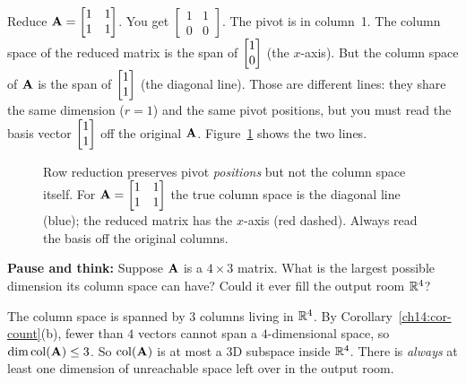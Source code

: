 \begin{labbox}
Reduce $\mathbf{A}=\begin{bmatrix}1&1\\1&1\end{bmatrix}$. You get
$\begin{bmatrix}1&1\\0&0\end{bmatrix}$. The pivot is in column~1. The column space of the reduced
matrix is the span of $\begin{bmatrix}1\\0\end{bmatrix}$ (the $x$-axis). But the column space of $\mathbf{A}$ is the
span of $\begin{bmatrix}1\\1\end{bmatrix}$ (the diagonal line). Those are different lines: they share the same dimension
($r=1$) and the same pivot positions, but you must read the basis vector $\begin{bmatrix}1\\1\end{bmatrix}$ off the
original $\mathbf{A}$. Figure~\ref{ch15:colspace-trap} shows the two lines.
\end{labbox}

\begin{figure}[htbp]
\centering
{}
\caption{Row reduction preserves pivot \emph{positions} but not the column space itself. For
$\mathbf{A}=\protect\begin{bmatrix}1&1\\1&1\protect\end{bmatrix}$ the true column space is the
diagonal line (blue); the reduced matrix has the $x$-axis (red dashed). Always read the basis
off the original columns.}
\label{ch15:colspace-trap}
\end{figure}

\begin{recoverybox}
\textbf{Pause and think:} Suppose $\mathbf{A}$ is a $4 \times 3$ matrix. What is the largest possible
dimension its column space can have? Could it ever fill the output room $\mathbb{R}^4$?
\vspace{0.3em}

The column space is spanned by $3$ columns living in $\mathbb{R}^4$. By Corollary~\ref{ch14:cor-count}(b),
fewer than $4$ vectors cannot span a $4$-dimensional space, so $\operatorname{dim} \operatorname{col}(\mathbf{A}) \le 3$. So $\operatorname{col}(\mathbf{A})$ is
at most a 3D subspace inside $\mathbb{R}^4$. There is \emph{always} at least one dimension of unreachable
space left over in the output room.
\end{recoverybox}

